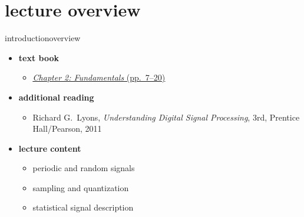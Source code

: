 

\subtitle{Part 3.1: Fundamentals I}


	

    \section[overview]{lecture overview}
        \begin{frame}{introduction}{overview}
            \begin{itemize}
                \item   \textbf{text book}  
                    \begin{itemize}
                        \item   \href{http://ieeexplore.ieee.org/xpl/ebooks/bookPdfWithBanner.jsp?fileName=6331119.pdf&bkn=6266785&pdfType=chapter}{\underline{\textit{Chapter 2: Fundamentals} (pp.~7--20)}}
                    \end{itemize}
                \item   \textbf{additional reading}  
                    \begin{itemize}
                        \item   Richard G.~Lyons, \textit{Understanding Digital Signal Processing}, 3rd, Prentice Hall/Pearson, 2011
                    \end{itemize}
                \bigskip
                \item<2->   \textbf{lecture content}
                    \begin{itemize}
                        \item<2->   periodic and random signals
                        \item<3->   sampling and quantization
                        \item<4->   statistical signal description
                    \end{itemize}
            \end{itemize}
        \end{frame}
        
